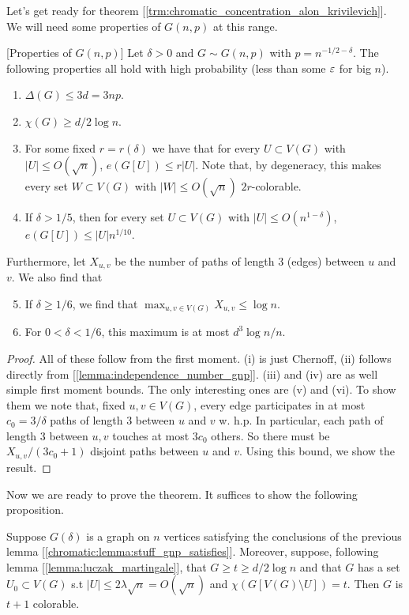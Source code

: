 Let's get ready for theorem
[\ref{trm:chromatic_concentration_alon_krivilevich}]. We will need
some properties of $G(n,p)$ at this range.
\begin{lemma}
	\label{chromatic:lemma:stuff_gnp_satisfies}
	[Properties of $G(n,p)$] Let $\delta > 0$ and $G \sim G(n,p)$ with $p
	= n^{-1/2 - \delta}$. The following properties all hold with high
	probability (less than some $\varepsilon$ for big $n$).
	\begin{enumerate}[label=(\roman*)]
		\item $\Delta(G) \leq 3d = 3np$.
		\item $\chi(G) \geq d/2 \log n$.
		\item For some fixed $r = r(\delta)$  we have that for every $U
			\subset V(G)$ with $|U| \leq O(\sqrt{n})$, $e(G[U]) \leq r|U|$.
			Note that, by degeneracy,
			this makes every set $W \subset V(G)$ with $|W| \leq O(\sqrt{n})$
			$2r$-colorable.
		\item If $\delta > 1/5$, then for every set $U \subset V(G)$ with
			$|U| \leq O(n^{1-\delta})$, $e(G[U]) \leq |U|n^{1/10}$.
	\end{enumerate}
	Furthermore, let $X_{u,v}$ be the number of paths of length 3 (edges)
	between $u$ and $v$. We also find that
	\begin{enumerate}[label=(\roman*)]
			\setcounter{enumi}{4}
		\item If $\delta \geq 1/6$, we find that $\max_{u,v \in V(G)} X_{u,
			v} \leq \log n$.
		\item For $0 < \delta < 1/6$, this maximum is at most  $d^3\log n / n$.
	\end{enumerate}
\end{lemma}
\begin{proof}
	All of these follow from the first moment. (i) is just Chernoff, (ii)
	follows directly from [\ref{lemma:independence_number_gnp}]. (iii) and (iv)
	are as well simple first moment bounds. The only interesting ones are
	(v) and (vi). To show them we note that, fixed $u,v \in V(G)$,  every
	edge participates
	in at most $c_0 = 3/\delta$ paths of length 3 between $u$ and $v$  w.
	h.p. In particular, each path of length 3 between $u,v$ touches at
	most $3c_0$ others.
	So there must be $X_{u,v}/(3c_0 + 1)$ disjoint paths between $u$ and
	$v$. Using this bound, we show the result.
\end{proof}

Now we are ready to prove the theorem. It suffices to show the
following proposition.

\begin{prop}
	\label{prop:main_prop_chr_concentration}
	Suppose $G(\delta)$ is a graph on $n$ vertices satisfying the
	conclusions of the previous lemma [\ref{chromatic:lemma:stuff_gnp_satisfies}].
	Moreover, suppose, following lemma [\ref{lemma:luczak_martingale}],
	that $G \geq t \geq d/2 \log n$ and that $G$ has a set $U_0 \subset V(G)$
	s.t $|U| \leq 2\lambda\sqrt{n} = O(\sqrt{n})$ and $\chi(G[V(G)
	\setminus U]) = t$. Then $G$ is $t + 1$ colorable.
\end{prop}

